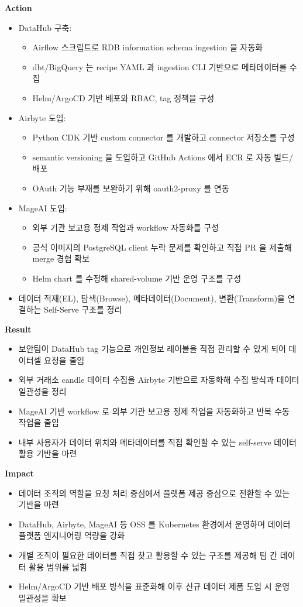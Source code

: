 \documentclass[letterpaper,11pt]{article}
\newcommand{\resumeSubProject}[2]{
  \item{
    {#1 \vspace{0pt}}
    {#2}
  }
}
\newcommand{\resumeSubBulletsStart}{%
  \begin{itemize}[leftmargin=1.5em, itemsep=2pt, topsep=2pt, label=$\circ$]%
}
\newcommand{\resumeSubBulletsEnd}{%
  \end{itemize}\vspace{-4pt}%
}
\newcommand{\resumeThirdListStart}{\begin{itemize}[leftmargin=2.3em, itemsep=1pt, label=$\circ$]}
\newcommand{\resumeThirdListEnd}{\end{itemize}}
\begin{document}
  \resumeSubProject{\textbf{Action}}{%
    \resumeSubBulletsStart
      \item DataHub 구축:
        \resumeThirdListStart
          \item Airflow 스크립트로 RDB information schema ingestion 을 자동화
          \item dbt/BigQuery 는 recipe YAML 과 ingestion CLI 기반으로 메타데이터를 수집
          \item Helm/ArgoCD 기반 배포와 RBAC, tag 정책을 구성
        \resumeThirdListEnd
      \item Airbyte 도입:
        \resumeThirdListStart
          \item Python CDK 기반 custom connector 를 개발하고 connector 저장소를 구성
          \item semantic versioning 을 도입하고 GitHub Actions 에서 ECR 로 자동 빌드/배포
          \item OAuth 기능 부재를 보완하기 위해 oauth2-proxy 를 연동
        \resumeThirdListEnd
      \item MageAI 도입:
        \resumeThirdListStart
          \item 외부 기관 보고용 정제 작업과 workflow 자동화를 구성
          \item 공식 이미지의 PostgreSQL client 누락 문제를 확인하고 직접 PR 을 제출해 merge 경험 확보
          \item Helm chart 를 수정해 shared-volume 기반 운영 구조를 구성
        \resumeThirdListEnd
      \item 데이터 적재(EL), 탐색(Browse), 메타데이터(Document), 변환(Transform)을 연결하는 Self-Serve 구조를 정리
    \resumeSubBulletsEnd
  }

  \resumeSubProject{\textbf{Result}}{%
    \resumeSubBulletsStart
      \item 보안팀이 DataHub tag 기능으로 개인정보 레이블을 직접 관리할 수 있게 되어 데이터셀 요청을 줄임
      \item 외부 거래소 candle 데이터 수집을 Airbyte 기반으로 자동화해 수집 방식과 데이터 일관성을 정리
      \item MageAI 기반 workflow 로 외부 기관 보고용 정제 작업을 자동화하고 반복 수동 작업을 줄임
      \item 내부 사용자가 데이터 위치와 메타데이터를 직접 확인할 수 있는 self-serve 데이터 활용 기반을 마련
    \resumeSubBulletsEnd
  }

  \resumeSubProject{\textbf{Impact}}{%
    \resumeSubBulletsStart
      \item 데이터 조직의 역할을 요청 처리 중심에서 플랫폼 제공 중심으로 전환할 수 있는 기반을 마련
      \item DataHub, Airbyte, MageAI 등 OSS 를 Kubernetes 환경에서 운영하며 데이터 플랫폼 엔지니어링 역량을 강화
      \item 개별 조직이 필요한 데이터를 직접 찾고 활용할 수 있는 구조를 제공해 팀 간 데이터 활용 범위를 넓힘
      \item Helm/ArgoCD 기반 배포 방식을 표준화해 이후 신규 데이터 제품 도입 시 운영 일관성을 확보
    \resumeSubBulletsEnd
  }
\end{document}
